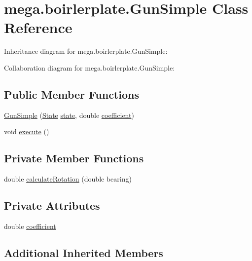 \hypertarget{classmega_1_1boirlerplate_1_1_gun_simple}{}\section{mega.\+boirlerplate.\+Gun\+Simple Class Reference}
\label{classmega_1_1boirlerplate_1_1_gun_simple}


Inheritance diagram for mega.\+boirlerplate.\+Gun\+Simple\+:


Collaboration diagram for mega.\+boirlerplate.\+Gun\+Simple\+:
\subsection*{Public Member Functions}
\begin{DoxyCompactItemize}
\item 
\hyperlink{classmega_1_1boirlerplate_1_1_gun_simple_ae3e0f2a1f6a8bda8d4129d189f380a49}{Gun\+Simple} (\hyperlink{classmega_1_1boirlerplate_1_1_state}{State} \hyperlink{classmega_1_1boirlerplate_1_1_component_a87b0d70f323b5fee60a200e07c9c20fd}{state}, double \hyperlink{classmega_1_1boirlerplate_1_1_gun_simple_aad9bb14d4a0c98bca3ddad45941f8fb5}{coefficient})
\item 
void \hyperlink{classmega_1_1boirlerplate_1_1_gun_simple_a5e0449b16dac5c1620c7bfa8ca8c7420}{execute} ()
\end{DoxyCompactItemize}
\subsection*{Private Member Functions}
\begin{DoxyCompactItemize}
\item 
double \hyperlink{classmega_1_1boirlerplate_1_1_gun_simple_aed0232e41ad98dcf39f16dca772f2d4e}{calculate\+Rotation} (double bearing)
\end{DoxyCompactItemize}
\subsection*{Private Attributes}
\begin{DoxyCompactItemize}
\item 
double \hyperlink{classmega_1_1boirlerplate_1_1_gun_simple_aad9bb14d4a0c98bca3ddad45941f8fb5}{coefficient}
\end{DoxyCompactItemize}
\subsection*{Additional Inherited Members}


